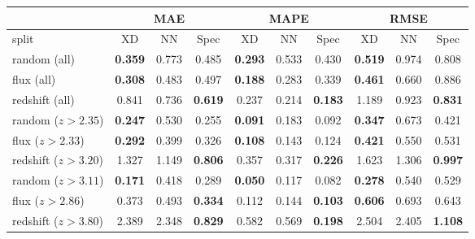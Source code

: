 
\begin{tabular}{ p{2.9cm}|ccc|ccc|ccc}
 & \multicolumn{3}{c}{MAE} & \multicolumn{3}{c}{MAPE} & \multicolumn{3}{c}{RMSE} \\
 \hline
 split & XD & NN & Spec & XD & NN & Spec & XD & NN & Spec \\
 \hline
 random (all) & \textbf{0.359} & 0.773 & 0.485 & \textbf{0.293} & 0.533 & 0.430 & \textbf{0.519} & 0.974 & 0.808  \\
 flux (all) & \textbf{0.308} & 0.483 & 0.497 & \textbf{0.188} & 0.283 & 0.339 & \textbf{0.461} & 0.660 & 0.886  \\
 redshift (all) & 0.841 & 0.736 & \textbf{0.619} & 0.237 & 0.214 & \textbf{0.183} & 1.189 & 0.923 & \textbf{0.831}  \\
 \hline
 random ($z > 2.35$) & \textbf{0.247} & 0.530 & 0.255 & \textbf{0.091} & 0.183 & 0.092 & \textbf{0.347} & 0.673 & 0.421  \\
 flux ($z > 2.33$) & \textbf{0.292} & 0.399 & 0.326 & \textbf{0.108} & 0.143 & 0.124 & \textbf{0.421} & 0.550 & 0.531  \\
 redshift ($z > 3.20$) & 1.327 & 1.149 & \textbf{0.806} & 0.357 & 0.317 & \textbf{0.226} & 1.623 & 1.306 & \textbf{0.997}  \\
 \hline
 random ($z > 3.11$) & \textbf{0.171} & 0.418 & 0.289 & \textbf{0.050} & 0.117 & 0.082 & \textbf{0.278} & 0.540 & 0.529  \\
 flux ($z > 2.86$) & 0.373 & 0.493 & \textbf{0.334} & 0.112 & 0.144 & \textbf{0.103} & \textbf{0.606} & 0.693 & 0.643  \\
 redshift ($z > 3.80$) & 2.389 & 2.348 & \textbf{0.829} & 0.582 & 0.569 & \textbf{0.198} & 2.504 & 2.405 & \textbf{1.108}  \\
 \hline
\end{tabular}
